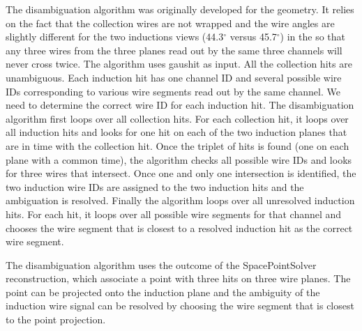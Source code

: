 The  disambiguation algorithm was originally developed for the  geometry. It relies on the fact that the collection wires are not wrapped and the wire angles are slightly different for the two inductions views (44.3$^{\circ}$ versus 45.7$^{\circ}$) in the  so that any three wires from the three planes read out by the same three channels will never cross twice. The algorithm uses gaushit as input. All the collection hits are unambiguous. Each induction hit has one channel ID and several possible wire IDs corresponding to various wire segments read out by the same channel. We need to determine the correct wire ID %
for each induction hit. The disambiguation algorithm first loops over all collection hits. For each collection hit, it loops over all induction hits and looks for one hit on each of the two induction planes that are in time with the collection hit. Once the triplet of hits is found (one on each plane with a common time), the algorithm checks all possible wire IDs and looks for three wires that intersect. Once one and only one intersection is identified, the two induction wire IDs are assigned to the two induction hits and the ambiguation is resolved. Finally the algorithm loops over all unresolved induction hits. For each hit, it loops over all possible wire segments for that channel and chooses the wire segment that is closest to a resolved induction hit as the correct wire segment. 

The  disambiguation algorithm uses the outcome of the SpacePointSolver reconstruction, which associate a \threed point with three hits on three wire planes. The \threed point can be projected onto the induction plane and the ambiguity of the induction wire signal can be resolved by choosing the wire segment that is closest to the \threed point projection. 

